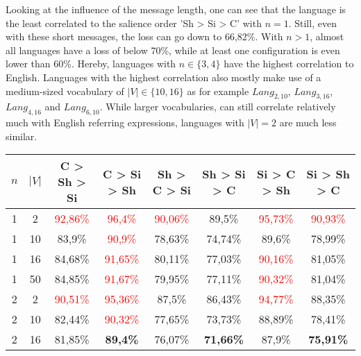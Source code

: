 Looking at the influence of the message length, one can see that the language is the least correlated to the salience order 'Sh > Si > C' with $n=1$.
Still, even with these short messages, the loss can go down to 66,82\%.
With $n>1$, almost all languages have a loss of below 70\%, while at least one configuration is even lower than 60\%.
Hereby, languages with $n \in \{3,4\}$ have the highest correlation to English.
Languages with the highest correlation also mostly make use of a medium-sized vocabulary of $|V| \in \{10,16\}$ as for example $Lang_{2,10}$, $Lang_{3,16}$, $Lang_{4,16}$ and $Lang_{6,10}$.
While larger vocabularies, can still correlate relatively much with English referring expressions, languages with $|V|=2$ are much less similar.

\begin{table}[ht]
    \centering
    \begin{tabular}{cc|c|c|c|c|c|c}
        \toprule
        $n$ & $|V|$ & \textbf{C > Sh > Si}     & \textbf{C > Si > Sh}     & \textbf{Sh > C > Si}     & \textbf{Sh > Si > C} & \textbf{Si > C > Sh}     & \textbf{Si > Sh > C}     \\\midrule
        {1} & {2}   & \textcolor{red}{92,86\%} & \textcolor{red}{96,4\%}  & \textcolor{red}{90,06\%} & {89,5\%}             & \textcolor{red}{95,73\%} & \textcolor{red}{90,93\%} \\
        {1} & {10}  & {83,9\%}                 & \textcolor{red}{90,9\%}  & {78,63\%}                & {74,74\%}            & {89,6\%}                 & {78,99\%}                \\
        {1} & {16}  & {84,68\%}                & \textcolor{red}{91,65\%} & {80,11\%}                & {77,03\%}            & \textcolor{red}{90,16\%} & {81,05\%}                \\
        {1} & {50}  & {84,85\%}                & \textcolor{red}{91,67\%} & {79,95\%}                & {77,11\%}            & \textcolor{red}{90,32\%} & {81,04\%}                \\
        {2} & {2}   & \textcolor{red}{90,51\%} & \textcolor{red}{95,36\%} & {87,5\%}                 & {86,43\%}            & \textcolor{red}{94,77\%} & {88,35\%}                \\
        {2} & {10}  & {82,44\%}                & \textcolor{red}{90,32\%} & {77,65\%}                & {73,73\%}            & {88,89\%}                & {78,41\%}                \\
        {2} & {16}  & {81,85\%}                & \textbf{89,4\%}          & {76,07\%}                & \textbf{71,66\%}     & {87,9\%}                 & \textbf{75,91\%}         \\

\end{tabular}
\end{table}
